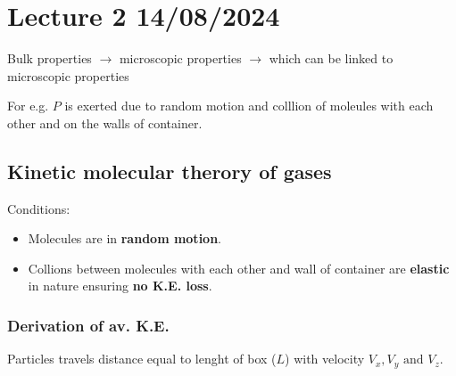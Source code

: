 \documentclass[fleqn,10pt]{SelfArx} %
\begin{document}

\clearpage
\section{Lecture 2 14/08/2024}

Bulk properties $\rightarrow$ microscopic properties $\rightarrow$ which can be linked to microscopic properties

For e.g. $P$ is exerted due to random motion and colllion of moleules with each other and on the walls of container.

\subsection{Kinetic molecular therory of gases}
Conditions:
\begin{itemize}[noitemsep]
        \item Molecules are in \textbf{random motion}.
        \item Collions between molecules with each other and wall of container are \textbf{elastic} in nature ensuring \textbf{no K.E. loss}.
\end{itemize}

\subsubsection*{Derivation of av. K.E.}
Particles travels distance equal to lenght of box ($L$) with velocity $V_x, V_y \text{ and } V_z$.
\end{document}
